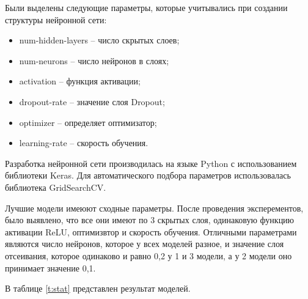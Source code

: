 Были выделены следующие параметры, которые учитывались при создании структуры нейронной сети:
\begin{itemize}
    \item num-hidden-layers – число скрытых слоев;
    \item num-neurons – число нейронов в слоях;
    \item activation – функция активации;
    \item dropout-rate – значение слоя Dropout;
    \item optimizer – определяет оптимизатор;
    \item learning-rate – скорость обучения.
\end{itemize}

Разработка нейронной сети производилась на языке Python с использованием библиотеки Keras. Для автоматического подбора параметров использовалась библиотека GridSearchCV.

Лучшие модели имеюют сходные параметры. После проведения эксперементов, было выявлено, что все они имеют по 3 скрытых слоя, одинаковую функцию активации ReLU, оптимизвтор и скорость обучения. Отличными параметрами являются число нейронов, которое у всех моделей разное, и значение слоя отсеивания, которое одинаково и равно 0,2 у 1 и 3 модели, а у 2 модели оно принимает значение 0,1. 

В таблице \ref{t:stat} представлен результат моделей.


